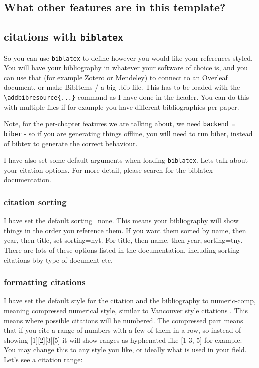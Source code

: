 \documentclass[../HWThesis.tex]{subfiles} %
\begin{document}
\begin{refsection}
\section{What other features are in this template?}

\subsection{citations with \texttt{biblatex}}

So you can use \texttt{biblatex} to define however you would like your references styled. You will have your bibliography in whatever your software of choice is, and you can use that (for example Zotero or Mendeley) to connect to an Overleaf document, or make BibItems / a  big .bib file. This has to be loaded with the \texttt{\textbackslash addbibresource\{...\}} command as I have done in the header. You can do this with multiple files if for example you have different bibliographies per paper. 

Note, for the per-chapter features we are talking about, we need \texttt{backend = biber} - so if you are generating things offline, you will need to run biber, instead of bibtex to generate the correct behaviour. 

I have also set some default arguments when loading \texttt{biblatex}. Lets talk about your citation options. For more detail, please search for the biblatex documentation.

\subsubsection{citation sorting}
I have set the default sorting=none. This means your bibliography will show things in the order you reference them. If you want them sorted by name, then year, then title, set sorting=nyt. For title, then name, then year, sorting=tny. There are lots of these options listed in the documentation, including sorting citations bby type of document etc. 

\subsubsection{formatting citations}
\label{sec: format-citations }

I have set the default style for the citation and the bibliography to numeric-comp, meaning compressed numerical style, similar to Vancouver style citations \cite{gum2}. 
This means where possible citations will be numbered. The compressed part means that if you cite a range of numbers with a few of them in a row, so instead of showing [1][2][3][5] it will show ranges as hyphenated like [1-3, 5] for example. You may change this to any style you like, or ideally what is used in your field. Let's see a citation range: \cite{gum2, Maier10, gum}


\end{refsection}
\end{document}
